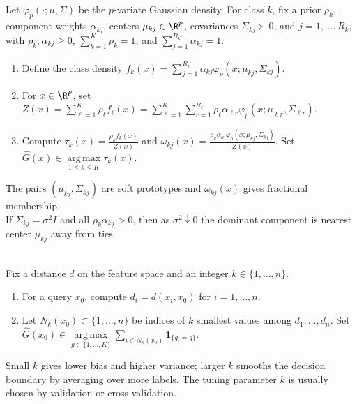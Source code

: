 \begin{method} \label{meth:sl-gaussian-mixture-prototype-classifier} \\
Let $\varphi_p(\cdot;\mu,\Sigma)$ be the $p$-variate Gaussian density.  For class $k$, fix a prior $\rho_k$, component weights $\alpha_{kj}$, centers $\mu_{kj}\in\R^p$, covariances $\Sigma_{kj}\succ0$, and $j=1,\ldots,R_k$, with $\rho_k,\alpha_{kj}\geq0$, $\sum\limits_{k=1}^K\rho_k=1$, and $\sum\limits_{j=1}^{R_k}\alpha_{kj}=1$.
\begin{enumerate}[label=(\roman*)]
\setlength{\itemsep}{0pt}
\item Define the class density $f_k(x)=\sum\limits_{j=1}^{R_k}\alpha_{kj}\varphi_p(x;\mu_{kj},\Sigma_{kj})$.
\item For $x\in\R^p$, set $Z(x)=\sum\limits_{\ell=1}^K\rho_\ell f_\ell(x)=\sum\limits_{\ell=1}^K\sum\limits_{r=1}^{R_\ell}\rho_\ell\alpha_{\ell r}\varphi_p(x;\mu_{\ell r},\Sigma_{\ell r})$.
\item Compute $\tau_k(x)=\frac{\rho_kf_k(x)}{Z(x)}$ and $\omega_{kj}(x)=\frac{\rho_k\alpha_{kj}\varphi_p(x;\mu_{kj},\Sigma_{kj})}{Z(x)}$. Set $\widehat{G}(x)\in\operatorname*{arg\,max}\limits_{1\leq k\leq K}\tau_k(x)$.
\end{enumerate}
The pairs $(\mu_{kj},\Sigma_{kj})$ are soft prototypes and $\omega_{kj}(x)$ gives fractional membership.\\
If $\Sigma_{kj}=\sigma^2I$ and all $\rho_k\alpha_{kj}>0$, then as $\sigma^2\downarrow0$ the dominant component is nearest center $\mu_{kj}$ away from ties.
\end{method}

\begin{method} \label{meth:sl-knn-classifier-metric-form} \\
Fix a distance $d$ on the feature space and an integer $k\in\{1,\ldots,n\}$.
\begin{enumerate}[label=(\roman*)]
\setlength{\itemsep}{0pt}
\item For a query $x_0$, compute $d_i=d(x_i,x_0)$ for $i=1,\ldots,n$.
\item Let $N_k(x_0)\subset\{1,\ldots,n\}$ be indices of $k$ smallest values among $d_1,\ldots,d_n$. Set $\widehat{G}(x_0)\in\operatorname*{arg\,max}\limits_{g\in\{1,\ldots,K\}}\sum\limits_{i\in N_k(x_0)}\mathbf{1}_{\{g_i=g\}}$.
\end{enumerate}
Small $k$ gives lower bias and higher variance; larger $k$ smooths the decision boundary by averaging over more labels. The tuning parameter $k$ is usually chosen by validation or cross-validation.
\end{method}

